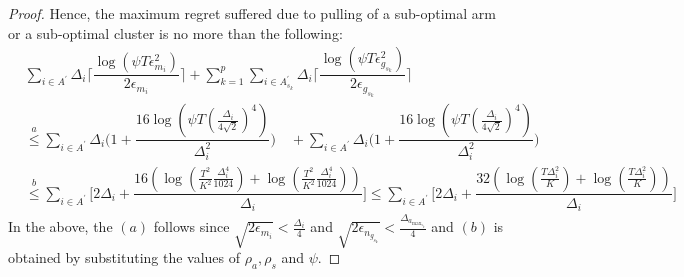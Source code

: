 \begin{proof}
Hence, the maximum regret suffered due to pulling of a sub-optimal arm or a sub-optimal cluster is no more than the following:
 \begin{align*}
 &\sum_{i\in A^{'}}\Delta_{i}\bigg\lceil\dfrac{\log{(\psi T\epsilon_{m_{i}}^{2})}}{2\epsilon_{m_{i}}}\bigg\rceil 
\!+\! \sum_{k=1}^{p}\sum_{i\in A_{s_{k}}^{'}}\Delta_{i}\bigg\lceil\dfrac{\log{(\psi T\epsilon_{g_{s_{k}}}^{2})}}{2\epsilon_{g_{s_{k}}}}\bigg\rceil \\
&\overset{a}{\leq}\sum_{i\in A^{'}}\Delta_{i}\bigg(1+\dfrac{16\log{\left(\psi T\left(\frac{\Delta_{i}}{4\sqrt{2}}\right)^{4}\right)}}{\Delta_{i}^{2}}\bigg) 
\quad+ \sum_{i\in A^{'}}\Delta_{i}\bigg(1+\dfrac{16\log{\left(\psi T\left(\frac{\Delta_{i}}{4\sqrt{2}}\right)^{4}\right)}}{\Delta_{i}^{2}}\bigg)
\\
 &\overset{b}{\leq} \sum_{i\in A^{'}}\!\bigg[ 2\Delta_{i}+\dfrac{16(\log{(\frac{T^2}{K^2}\frac{\Delta_{i}^{4}}{1024})} + \log{(\frac{T^2}{K^2}\frac{\Delta_{i}^{4}}{1024})})}{\Delta_{i}} \bigg] \leq \sum_{i\in A^{'}}\!\bigg[ 2\Delta_{i}+\dfrac{32\left(\log{(\frac{T\Delta_{i}^2}{K})} + \log{(\frac{T\Delta_{i}^2}{K})}\right)}{\Delta_{i}} \bigg]
 \end{align*}
In the above, the $(a)$ follows since $\sqrt{2\epsilon_{m_{i}}} < \frac{\Delta_{i}}{4}$ and $\sqrt{2\epsilon_{n_{g_{s_{k}}}}} < \frac{\Delta_{a_{\max_{s_{k}}}}}{4}$ and $(b)$ is obtained by substituting the values of $\rho_a,\rho_s$ and $\psi$.

 

\end{proof}
